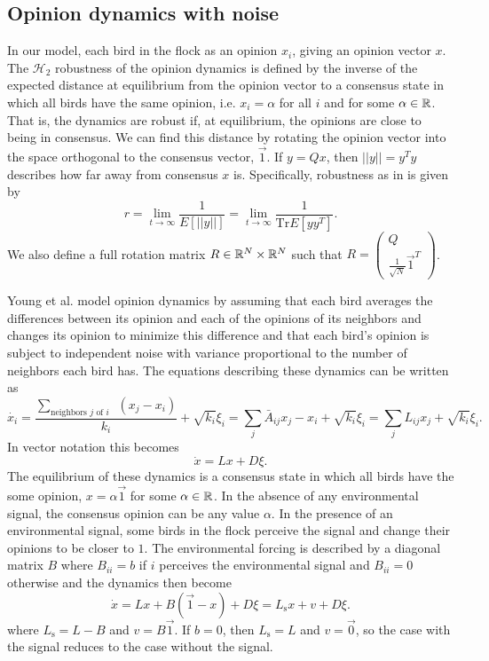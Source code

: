 \documentclass{article}
\newcommand{\Tr}{\text{Tr}}
\begin{document}
\subsection{Opinion dynamics with noise }
In our model, each bird in the flock as an opinion $x_i$, giving an opinion vector $x$. The $\mathscr{H}_2$ robustness of the opinion dynamics is defined by the inverse of the expected distance at equilibrium from the opinion vector to a consensus state in which all birds have the same opinion, i.e. $x_i=\alpha$ for all $i$ and for some $\alpha\in{\mathbb{R}}$. That is, the dynamics are robust if, at equilibrium, the opinions are close to being in consensus. We can find this distance by rotating the opinion vector into the space orthogonal to the consensus vector, $\vec{1}$.  If $y=Qx$, then $||y||=y^Ty$ describes how far away from consensus $x$ is. Specifically, robustness as in \cite{Young:2010fk} is given by 
\begin{equation}
r=\lim_{t\to\infty}\frac{1}{E[||y||]}=\lim_{t\to\infty}\frac{1}{\Tr E[yy^T]}. \label{H2_robustness}
\end{equation}
We also define a full rotation matrix $R\in{\mathbb{R}}^N\times{\mathbb{R}}^N$ such that $R=\left(\begin{array}{cc} Q \\ \frac{1}{\sqrt{N}}\vec{1}^T \end{array}\right)$.

Young et al. \cite{Young:2010fk} model opinion dynamics by assuming that each bird averages the differences between its opinion and each of the opinions of its neighbors and changes its opinion to minimize this difference and that each bird's opinion is subject to independent noise with variance proportional to the number of neighbors each bird has. The equations describing these dynamics can be written as 
\begin{equation}
\dot{x_i}=\frac{\sum_{\text{neighbors $j$ of $i$ } }(x_j-x_i)}{k_i} +\sqrt{k_i}\xi_i=\sum_j\bar{A}_{ij}x_j-x_i+\sqrt{k_i}\xi_i=\sum_jL_{ij}x_j+\sqrt{k_i}\xi_i.
\end{equation}
In vector notation this becomes
\begin{equation}
\dot{x}=Lx+D\xi.
\end{equation}
The equilibrium of these dynamics is a consensus state in which all birds have the some opinion, $x=\alpha\vec{1}$ for some $\alpha\in{\mathbb{R}}$. In the absence of any environmental signal, the consensus opinion can be any value $\alpha$. In the presence of an environmental signal, some birds in the flock perceive the signal and change their opinions to be closer to $1$. The environmental forcing is described by a diagonal matrix $B$ where $B_{ii}=b$ if $i$ perceives the environmental signal and $B_{ii}=0$ otherwise and the dynamics then become
\begin{equation}
\dot{x}=Lx+B(\vec{1}-x)+D\xi=L_\text{s}x+v+D\xi.
\end{equation}
where $L_\text{s}=L-B$ and $v=B\vec{1}$. If $b=0$, then $L_\text{s}=L$ and $v=\vec{0}$, so the case with the signal reduces to the case without the signal. 
\end{document}
